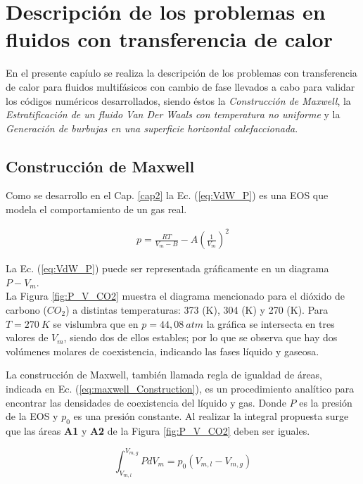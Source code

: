 \chapter{Descripción de los problemas en fluidos con transferencia de calor }
\graphicspath{{figs/cap4/}}
\label{cap4}

En el presente capíulo se realiza la descripción de los problemas con transferencia de calor para fluidos multifásicos con cambio de fase llevados a cabo para validar los códigos numéricos desarrollados, siendo éstos la \textit{Construcción de Maxwell}, la \textit{Estratificación de un fluido Van Der Waals con temperatura no uniforme} y la \textit{Generación de burbujas en una superficie horizontal calefaccionada}.

\section{Construcción de Maxwell}

Como se desarrollo en el Cap. \ref{cap2} la Ec. (\ref{eq:VdW_P}) es una EOS que modela el comportamiento de un gas real.

\begin{align*}
	p = \frac{R T}{V_m - B} - A {\left(\frac{1}{V_m}\right)}^2
\end{align*}

La Ec. (\ref{eq:VdW_P}) puede ser representada gráficamente en un diagrama $P - V_m$. \\ La Figura \ref{fig:P_V_CO2} muestra el diagrama mencionado para el dióxido de carbono ($CO_2$) a distintas temperaturas: 373 (K), 304 (K) y 270 (K). Para $T = 270 \> K$ se vislumbra que en $p = 44,08 \> atm$ la gráfica se intersecta en tres valores de $V_m$, siendo dos de ellos estables; por lo que se observa que hay dos volúmenes molares de coexistencia, indicando las fases líquido y gaseosa.

La construcción de Maxwell, también llamada regla de igualdad de áreas, indicada en Ec. (\ref{eq:maxwell_Construction}), es un procedimiento analítico para encontrar las densidades de coexistencia del líquido y gas. Donde $P$ es la presión de la EOS y $p_0$ es una presión constante. Al realizar la integral propuesta surge que las áreas \textbf{A1} y \textbf{A2} de la Figura \ref{fig:P_V_CO2} deben ser iguales.

\begin{equation}
\int_{V_{m,l}}^{V_{m,g}} P d V_m = p_0 (V_{m,l} -  V_{m,g})
\label{eq:maxwell_Construction}
\end{equation}

